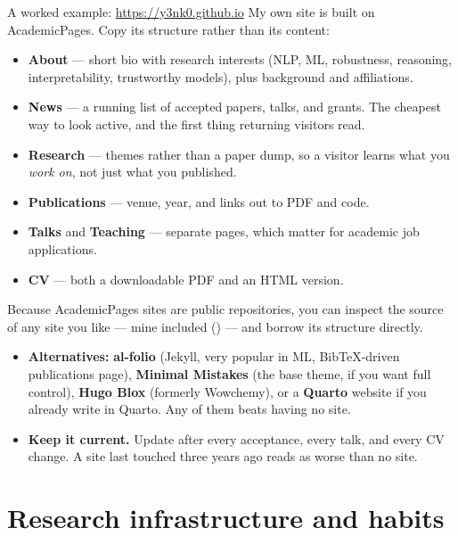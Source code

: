 \documentclass[11pt,a4paper]{article}
\begin{document}
\begin{cbox}{A worked example: \url{https://y3nk0.github.io}}
My own site is built on AcademicPages. Copy its structure rather than its
content:

\begin{itemize}
  \item \textbf{About} --- short bio with research interests (NLP, ML,
        robustness, reasoning, interpretability, trustworthy models), plus
        background and affiliations.
  \item \textbf{News} --- a running list of accepted papers, talks, and grants.
        The cheapest way to look active, and the first thing returning
        visitors read.
  \item \textbf{Research} --- themes rather than a paper dump, so a visitor
        learns what you \emph{work on}, not just what you published.
  \item \textbf{Publications} --- venue, year, and links out to PDF and code.
  \item \textbf{Talks} and \textbf{Teaching} --- separate pages, which matter
        for academic job applications.
  \item \textbf{CV} --- both a downloadable PDF and an HTML version.
\end{itemize}
Because AcademicPages sites are public repositories, you can inspect the
source of any site you like --- mine included
() --- and borrow its structure
directly.
\end{cbox}

\begin{itemize}
  \item \textbf{Alternatives:} \textbf{al-folio} (Jekyll, very popular in ML,
        BibTeX-driven publications page), \textbf{Minimal Mistakes} (the base
        theme, if you want full control), \textbf{Hugo Blox} (formerly
        Wowchemy), or a \textbf{Quarto} website if you already write in Quarto.
        Any of them beats having no site.
  \item \textbf{Keep it current.} Update after every acceptance, every talk,
        and every CV change. A site last touched three years ago reads as
        worse than no site.
\end{itemize}

\section{Research infrastructure and habits}
\label{sec:infra}
\end{document}
